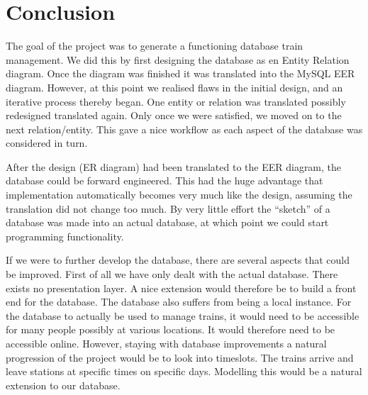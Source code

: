 \section{Conclusion}


The goal of the project was to generate a functioning database train 
management. We did this by first designing the database as en Entity Relation 
diagram. Once the diagram was finished it was translated into the MySQL EER 
diagram. However, at this point we realised flaws in the initial design, and an 
iterative process thereby began. One entity or relation was translated possibly 
redesigned translated again. Only once we were satisfied, we moved on to the 
next relation/entity. This gave a nice workflow as each aspect of the database 
was considered in turn.

After the design (ER diagram) had been translated to the EER diagram, the 
database could be forward engineered. This had the huge advantage that 
implementation automatically becomes very much like the design, assuming the 
translation did not change too much. By very little effort the ``sketch'' of a 
database was made into an actual database, at which point we could start 
programming functionality.


If we were to further develop the database, there are several aspects that 
could be improved. First of all we have only dealt with the actual database. 
There exists no presentation layer. A nice extension would therefore be to 
build a front end for the database. The database also suffers from being a 
local instance. For the database to actually be used to manage trains, it would 
need to be accessible for many people possibly at various locations. It would 
therefore need to be accessible online. However, staying with database 
improvements a natural progression of the project would be to look into 
timeslots. The trains arrive and leave stations at specific times on specific 
days. Modelling this would be a natural extension to our database. 
